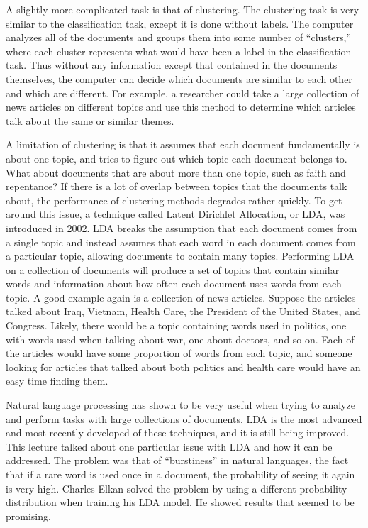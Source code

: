 \documentclass[onecolumn, 12pt]{article}
\begin{document}
A slightly more complicated task is that of clustering.  The clustering task
is very similar to the classification task, except it is done without labels.
The computer analyzes all of the documents and groups them into some number of
``clusters,'' where each cluster represents what would have been a label in the
classification task.  Thus without any information except that contained in the
documents themselves, the computer can decide which documents are similar to
each other and which are different.  For example, a researcher could take a
large collection of news articles on different topics and use this method to 
determine which articles talk about the same or similar themes.

A limitation of clustering is that it assumes that each document fundamentally
is about one topic, and tries to figure out which topic each document belongs
to.  What about documents that are about more than one topic, such as faith and
repentance?  If there is a lot of overlap between topics that the documents
talk about, the performance of clustering methods degrades rather quickly.  To
get around this issue, a technique called Latent Dirichlet Allocation, or LDA,
was introduced in 2002.  LDA breaks the assumption that each document comes
from a single topic and instead assumes that each word in each document comes
from a particular topic, allowing documents to contain many topics.  Performing
LDA on a collection of documents will produce a set of topics that contain
similar words and information about how often each document uses words from
each topic.  A good example again is a collection of news articles.  Suppose
the articles talked about Iraq, Vietnam, Health Care, the President of the
United States, and Congress.  Likely, there would be a topic containing words
used in politics, one with words used when talking about war, one about
doctors, and so on.  Each of the articles would have some proportion of words
from each topic, and someone looking for articles that talked about both
politics and health care would have an easy time finding them.

Natural language processing has shown to be very useful when trying to analyze
and perform tasks with large collections of documents.  LDA is the most
advanced and most recently developed of these techniques, and it is still being
improved.  This lecture talked about one particular issue with LDA and how it 
can be addressed.  The problem was that of ``burstiness'' in natural languages,
the fact that if a rare word is used once in a document, the probability of
seeing it again is very high.  Charles Elkan solved the problem by using a
different probability distribution when training his LDA model.  He showed
results that seemed to be promising.
\end{document}
